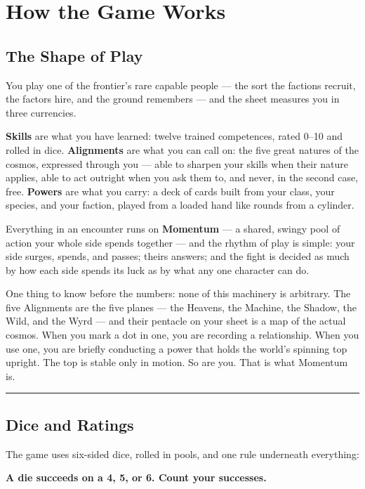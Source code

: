 \chapter{How the Game Works}

\section{The Shape of Play}

You play one of the frontier's rare capable people --- the sort the factions recruit, the factors hire, and the ground remembers --- and the sheet measures you in three currencies.

\textbf{Skills} are what you have learned: twelve trained competences, rated 0--10 and rolled in dice. \textbf{Alignments} are what you can call on: the five great natures of the cosmos, expressed through you --- able to sharpen your skills when their nature applies, able to act outright when you ask them to, and never, in the second case, free. \textbf{Powers} are what you carry: a deck of cards built from your class, your species, and your faction, played from a loaded hand like rounds from a cylinder.

Everything in an encounter runs on \textbf{Momentum} --- a shared, swingy pool of action your whole side spends together --- and the rhythm of play is simple: your side surges, spends, and passes; theirs answers; and the fight is decided as much by how each side spends its luck as by what any one character can do.

One thing to know before the numbers: none of this machinery is arbitrary. The five Alignments are the five planes --- the Heavens, the Machine, the Shadow, the Wild, and the Wyrd --- and their pentacle on your sheet is a map of the actual cosmos. When you mark a dot in one, you are recording a relationship. When you use one, you are briefly conducting a power that holds the world's spinning top upright. The top is stable only in motion. So are you. That is what Momentum is.

\medskip\hrule\medskip

\section{Dice and Ratings}

The game uses six-sided dice, rolled in pools, and one rule underneath everything:

\begin{center}
\textbf{A die succeeds on a 4, 5, or 6. Count your successes.}
\end{center}

